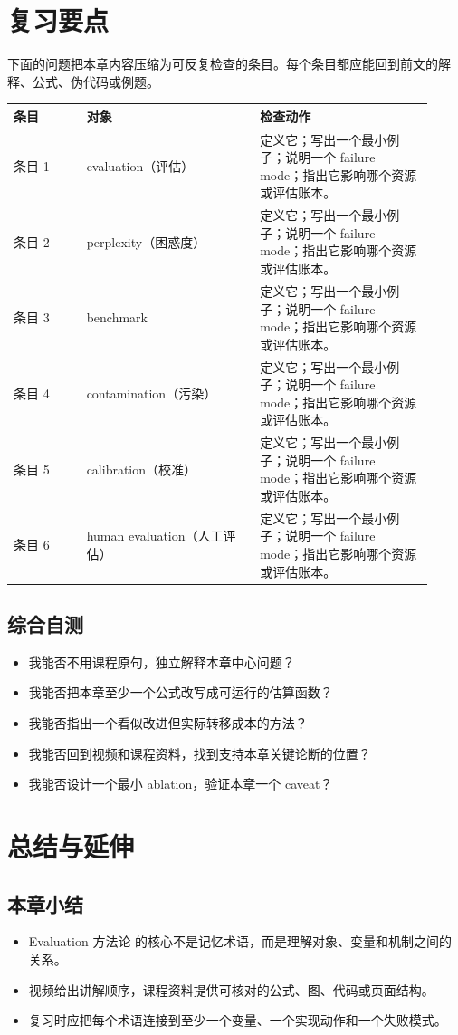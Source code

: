 \documentclass[a4paper]{article}
\begin{document}
\section{复习要点}
下面的问题把本章内容压缩为可反复检查的条目。每个条目都应能回到前文的解释、公式、伪代码或例题。
\begin{longtable}{p{0.16\linewidth}p{0.38\linewidth}p{0.38\linewidth}}
\toprule
\textbf{条目} & \textbf{对象} & \textbf{检查动作}\\
\midrule
条目 1 & evaluation（评估） & 定义它；写出一个最小例子；说明一个 failure mode；指出它影响哪个资源或评估账本。\\
条目 2 & perplexity（困惑度） & 定义它；写出一个最小例子；说明一个 failure mode；指出它影响哪个资源或评估账本。\\
条目 3 & benchmark & 定义它；写出一个最小例子；说明一个 failure mode；指出它影响哪个资源或评估账本。\\
条目 4 & contamination（污染） & 定义它；写出一个最小例子；说明一个 failure mode；指出它影响哪个资源或评估账本。\\
条目 5 & calibration（校准） & 定义它；写出一个最小例子；说明一个 failure mode；指出它影响哪个资源或评估账本。\\
条目 6 & human evaluation（人工评估） & 定义它；写出一个最小例子；说明一个 failure mode；指出它影响哪个资源或评估账本。\\
\bottomrule
\end{longtable}
\subsection{综合自测}
\begin{itemize}
\item 我能否不用课程原句，独立解释本章中心问题？
\item 我能否把本章至少一个公式改写成可运行的估算函数？
\item 我能否指出一个看似改进但实际转移成本的方法？
\item 我能否回到视频和课程资料，找到支持本章关键论断的位置？
\item 我能否设计一个最小 ablation，验证本章一个 caveat？
\end{itemize}
\section{总结与延伸}
\subsection{本章小结}
\begin{itemize}
\item Evaluation 方法论 的核心不是记忆术语，而是理解对象、变量和机制之间的关系。
\item 视频给出讲解顺序，课程资料提供可核对的公式、图、代码或页面结构。
\item 复习时应把每个术语连接到至少一个变量、一个实现动作和一个失败模式。
\end{itemize}
\end{document}
